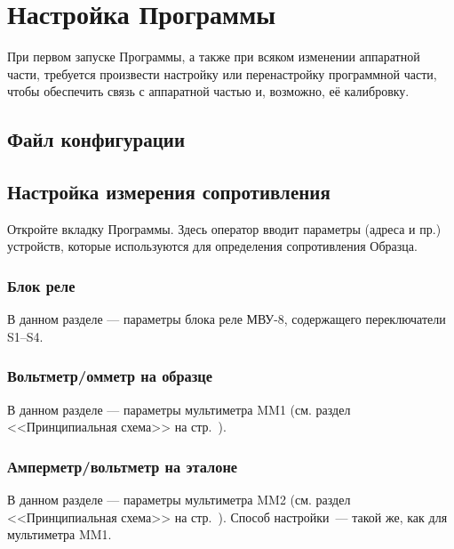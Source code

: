\documentclass[12pt, a4paper, twocolumn]{report}
\begin{document}
\chapter{Настройка Программы}

При первом запуске Программы, а также при всяком изменении аппаратной части, требуется произвести настройку или перенастройку программной части, чтобы обеспечить связь с аппаратной частью и, возможно, её калибровку.

\section{Файл конфигурации}



\section{Настройка измерения сопротивления}

Откройте вкладку  Программы. Здесь оператор вводит параметры (адреса и пр.) устройств, которые используются для определения сопротивления Образца.

\subsection{Блок реле}

В данном разделе --- параметры блока реле МВУ-8, содержащего переключатели S1--S4.



\subsection{Вольтметр/омметр на образце}
\label{sec_mm1_config}

В данном разделе --- параметры мультиметра MM1 (см. раздел <<Принципиальная схема>> на стр.~\pageref{sec_schematic_diagram}).



\subsection{Амперметр/вольтметр на эталоне}

В данном разделе --- параметры мультиметра MM2 (см. раздел <<Принципиальная схема>> на стр.~\pageref{sec_schematic_diagram}). Способ настройки~--- такой же, как для мультиметра MM1.
\end{document}

